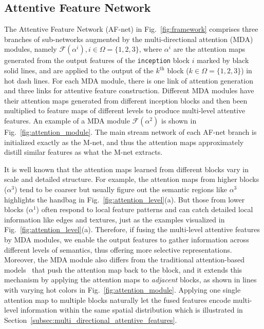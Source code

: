 \documentclass[10pt,twocolumn,letterpaper]{article}
\begin{document}
\vspace{-0.1cm}
\subsection{Attentive Feature Network}
\label{subsec:model_single_branch}

The Attentive Feature Network (AF-net) in Fig.~\ref{fig:framework} comprises three branches of sub-networks augmented by the multi-directional attention (MDA) modules, namely $\mathcal{F}(\alpha^i), i\in\Omega=\{1,2,3\}$, where $\alpha^i$ are the attention maps generated from the output features of the \texttt{inception} block $i$ marked by black solid lines, and are applied to the output of the $k^\text{th}$ block ($k\in\Omega=\{1,2,3\}$) in hot dash lines.
For each MDA module, there is one link of attention generation and three links for attentive feature construction. Different MDA modules have their attention maps generated from different inception blocks and then been multiplied to feature maps of different levels to produce multi-level attentive features. An example of a MDA module $\mathcal{F}(\alpha^2)$ is shown in Fig.~\ref{fig:attention_module}.
The main stream network of each AF-net branch is initialized exactly as the M-net, and thus the attention maps approximately distill similar features as what the M-net extracts.

It is well known that the attention maps learned from different blocks vary in scale and detailed structure.
For example, the attention maps from higher blocks (\eg $\alpha^3$) tend to be coarser but usually figure out the semantic regions like $\alpha^3$ highlights the handbag in Fig.~\ref{fig:attention_level}(a).
But those from lower blocks (\eg $\alpha^1$) often respond to local feature patterns and can catch detailed local information like edges and textures, just as the examples visualized in Fig.~\ref{fig:attention_level}(a).
Therefore, if fusing the multi-level attentive features by MDA modules, we enable the output features to gather information across different levels of semantics, thus offering more selective representations.
Moreover, the MDA module also differs from the traditional attention-based models~\cite{newell2016stacked,xu2015show} that push the attention map back to the  block, and it extends this mechanism by applying the attention maps to \textit{adjacent} blocks, as shown in lines with varying hot colors in Fig.~\ref{fig:attention_module}.
Applying one single attention map to multiple blocks naturally let the fused features encode multi-level information within the same spatial distribution which is illustrated in Section~\ref{subsec:multi_directional_attentive_features}.
\end{document}
